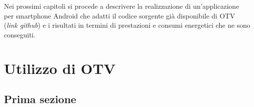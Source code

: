 \documentclass[12pt,a4paper,openright,twoside]{report}
\begin{document}
Nei prossimi capitoli si procede a descrivere la realizzazione di un'applicazione per smartphone Android che adatti il codice
sorgente già disponibile di OTV (\textit{link github}) e i risultati in termini di prestazioni e consumi energetici che ne sono conseguiti.




\clearpage{\pagestyle{empty}\cleardoublepage}

\tableofcontents
\rhead[\fancyplain{}{\bfseries\leftmark}]{\fancyplain{}{\bfseries\thepage}}
\clearpage{\pagestyle{empty}\cleardoublepage}

\lhead[\fancyplain{}{\bfseries\thepage}]{\fancyplain{}{\bfseries\rightmark}}


\chapter{Utilizzo di OTV}
\section{Prima sezione}




\clearpage{\pagestyle{empty}\cleardoublepage}












\end{document}
